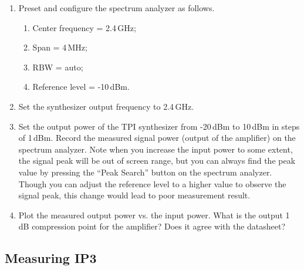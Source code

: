 \documentclass[letterpaper, 11pt]{article}
\begin{document}
\begin{enumerate}
	\item Preset and configure the spectrum analyzer as follows.
		\begin{enumerate}
			\item Center frequency = 2.4\,GHz;
			\item Span = 4\,MHz;
			\item RBW = auto;
			\item Reference level = -10\,dBm.
		\end{enumerate}
		
	\item Set the synthesizer output frequency to 2.4\,GHz.
	
	\item Set the output power of the TPI synthesizer from -20\,dBm to 10\,dBm in steps of 1\,dBm. Record the measured signal power (output of the amplifier) on the spectrum analyzer. Note when you increase the input power to some extent, the signal peak will be out of screen range, but you can always find the peak value by pressing the ``Peak Search'' button on the spectrum analyzer. Though you can adjust the reference level to a higher value to observe the signal peak, this change would lead to poor measurement result.
	
	\item Plot the measured output power vs. the input power. What is the output 1\,dB compression point for the amplifier? Does it agree with the datasheet?
\end{enumerate}

\subsection{Measuring IP3}
\label{sec:ip3}
\end{document}

